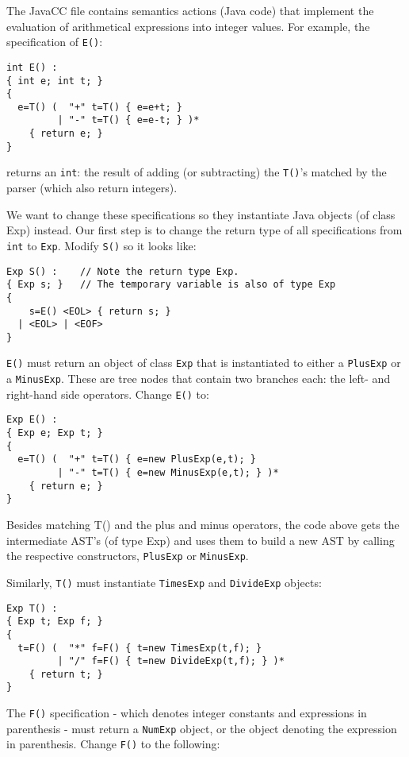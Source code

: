\documentclass{article}
\begin{document}
The JavaCC file contains semantics actions (Java code) that implement the evaluation of arithmetical expressions into integer values. For example, the specification of \verb+E()+:
\begin{verbatim}
int E() :
{ int e; int t; }
{
  e=T() (  "+" t=T() { e=e+t; }
         | "-" t=T() { e=e-t; } )*
    { return e; }
}
\end{verbatim}
returns an \verb+int+: the result of adding (or subtracting) the \verb+T()+'s matched by the parser (which also return integers).

We want to change these specifications so they instantiate Java objects (of class Exp) instead. Our first step is to change the return type of all specifications from \verb+int+ to \verb+Exp+. Modify \verb+S()+ so it looks like:

\begin{verbatim}
Exp S() :    // Note the return type Exp.
{ Exp s; }   // The temporary variable is also of type Exp
{
    s=E() <EOL> { return s; }
  | <EOL> | <EOF>
}
\end{verbatim}

\verb+E()+ must return an object of class \verb+Exp+ that is instantiated to either a \verb+PlusExp+ or a \verb+MinusExp+. These are tree nodes that contain two branches each: the left- and right-hand side operators.  Change \verb+E()+ to:

\begin{verbatim}
Exp E() :
{ Exp e; Exp t; }
{
  e=T() (  "+" t=T() { e=new PlusExp(e,t); }
         | "-" t=T() { e=new MinusExp(e,t); } )*
    { return e; }
}
\end{verbatim}

Besides matching T() and the plus and minus operators, the code above gets the intermediate AST's (of type Exp) and  uses them to build a new AST by calling the respective constructors, {\tt PlusExp} or {\tt MinusExp}.



Similarly, \verb+T()+ must instantiate \verb+TimesExp+ and \verb+DivideExp+ objects:

\begin{verbatim}
Exp T() :
{ Exp t; Exp f; }
{
  t=F() (  "*" f=F() { t=new TimesExp(t,f); }
         | "/" f=F() { t=new DivideExp(t,f); } )*
    { return t; }
}
\end{verbatim}

The \verb+F()+ specification - which denotes integer constants and expressions in parenthesis - must return a \verb+NumExp+ object, or the object denoting the expression in parenthesis. Change \verb+F()+ to the following:
\end{document}
